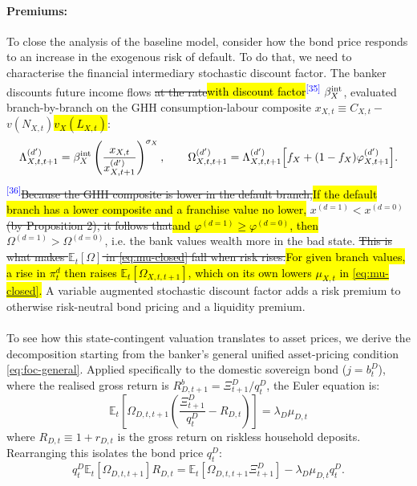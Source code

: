\documentclass[11pt]{article}
\newcommand{\E}{\mathbb{E}}
\newcommand{\A}[1]{\hl{#1}}
\newcommand{\D}[1]{{\color{red}\st{#1}}}
\newcommand{\chg}[1]{\textsuperscript{\textcolor{blue}{\scriptsize[#1]}}}
\begin{document}
\paragraph{Premiums:} To close the analysis of the baseline model, consider how the bond price responds to an increase in the exogenous risk of default. To do that, we need to characterise the financial intermediary stochastic discount factor. The banker discounts future income flows \D{at the rate}\A{with discount factor}\chg{35} $\beta^{\rm int}_X$, evaluated branch-by-branch on the GHH consumption-labour composite $x_{X,t} \equiv C_{X,t} -$ \D{$v(N_{X,t})$}\A{$v_X(L_{X,t})$}:
\begin{equation}
\Lambda^{(d')}_{X,t,t+1}
=\beta^{\rm int}_X
 \left(\frac{x_{X,t}}{x^{(d')}_{X,t+1}}\right)^{\sigma_X},
\qquad
\Omega^{(d')}_{X,t,t+1}
=\Lambda^{(d')}_{X,t,t+1}\Bigl[f_X+(1-f_X)\varphi^{(d')}_{X,t+1}\Bigr].
\label{eq:branch-sdf}
\end{equation}
\chg{36}\D{Because the GHH composite is lower in the default branch,}\A{If the default branch has a lower composite and a franchise value no lower,} $x^{(d=1)}<x^{(d=0)}$ \D{(by Proposition 2), it follows that}\A{and $\varphi^{(d=1)}\ge\varphi^{(d=0)}$, then} $\Omega^{(d=1)}>\Omega^{(d=0)}$, i.e. the bank values wealth more in the bad state. \D{This is what makes $\E_t[\Omega]$ in \eqref{eq:mu-closed} fall when risk rises.}\A{For given branch values, a rise in $\pi^d_t$ then raises $\E_t[\Omega_{X,t,t+1}]$, which on its own lowers $\mu_{X,t}$ in {\eqref{eq:mu-closed}}.} A variable augmented stochastic discount factor adds a risk premium to otherwise risk-neutral bond pricing and a liquidity premium. \\
\\
To see how this state-contingent valuation translates to asset prices, we derive the decomposition starting from the banker's general unified asset-pricing condition \eqref{eq:foc-general}. Applied specifically to the domestic sovereign bond ($j=b_t^D$), where the realised gross return is $R_{D,t+1}^b = \Xi^D_{t+1}/q^D_t$, the Euler equation is:
\begin{equation}
\E_t\left[\Omega_{D,t,t+1}\left(\frac{\Xi^D_{t+1}}{q^D_t} - R_{D,t}\right)\right] = \lambda_D\mu_{D,t}
\label{eq:euler-bond}
\end{equation}
where $R_{D,t} \equiv 1+r_{D,t}$ is the gross return on riskless household deposits. Rearranging this isolates the bond price $q^D_t$:
\begin{equation}
q^D_t \E_t\left[\Omega_{D,t,t+1}\right] R_{D,t} = \E_t\left[\Omega_{D,t,t+1}\Xi^D_{t+1}\right] - \lambda_D\mu_{D,t} q^D_t.
\label{eq:euler-rearranged}
\end{equation}
\end{document}
